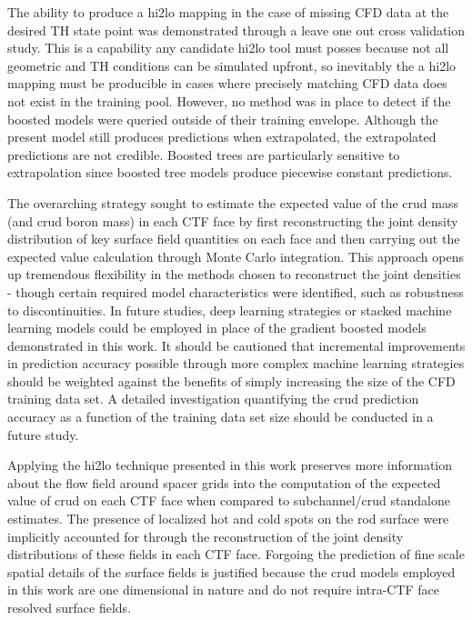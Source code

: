 The ability to produce a hi2lo mapping in the case of missing CFD data at the desired TH state point was demonstrated through a leave one out cross validation study.  This is a capability any candidate hi2lo tool must posses because not all geometric and TH conditions can be simulated upfront, so inevitably the a hi2lo mapping must be producible in cases where precisely matching CFD data does not exist in the training pool. However, no method was in place to detect if the boosted models were queried outside of their training envelope.  Although the present model still produces predictions when extrapolated, the extrapolated predictions are not credible.  Boosted trees are particularly sensitive to extrapolation since boosted tree models produce piecewise constant predictions.

The overarching strategy sought to estimate the expected value of the crud mass (and crud boron mass) in each CTF face by first reconstructing the joint density distribution of key surface field quantities on each face and then carrying out the expected value calculation through Monte Carlo integration.  This approach opens up tremendous flexibility in the methods chosen to reconstruct the joint densities - though certain required model characteristics were identified, such as robustness to discontinuities.  In future studies, deep learning strategies or stacked machine learning models could be employed in place of the gradient boosted models demonstrated in this work.  It should be cautioned that incremental improvements in prediction accuracy possible through more complex  machine learning strategies should be weighted against the benefits of simply increasing the size of the CFD training data set.  A detailed investigation quantifying the crud prediction accuracy as a function of the training data set size should be conducted in a future study.

Applying the hi2lo technique presented in this work preserves more information about the flow field around spacer grids into the computation of the expected value of crud on each CTF face when compared to subchannel/crud standalone estimates.  The presence of localized hot and cold spots on the rod surface were implicitly accounted for through the reconstruction of the joint density distributions of these fields in each CTF face.  Forgoing the prediction of fine scale spatial details of the surface fields is justified because the crud models employed in this work are one dimensional in nature and do not require intra-CTF face resolved surface fields.

